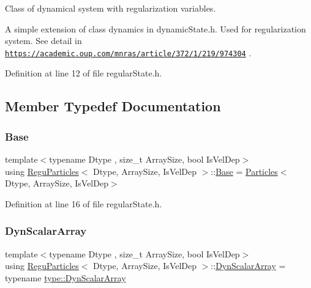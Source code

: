 Class of dynamical system with regularization variables. 

A simple extension of class dynamics in dynamic\+State.\+h. Used for regularization system. See detail in \href{https://academic.oup.com/mnras/article/372/1/219/974304}{\tt https\+://academic.\+oup.\+com/mnras/article/372/1/219/974304} . 

Definition at line 12 of file regular\+State.\+h.



\subsection{Member Typedef Documentation}
\mbox{\label{class_regu_particles_afcabde6e4f3c2648f37b23fee95758e0}} 
\subsubsection{\texorpdfstring{Base}{Base}}
{\footnotesize\ttfamily template$<$typename Dtype , size\+\_\+t Array\+Size, bool Is\+Vel\+Dep$>$ \\
using \mbox{\hyperlink{class_regu_particles}{Regu\+Particles}}$<$ Dtype, Array\+Size, Is\+Vel\+Dep $>$\+::\mbox{\hyperlink{class_regu_particles_afcabde6e4f3c2648f37b23fee95758e0}{Base}} =  \mbox{\hyperlink{struct_particles}{Particles}}$<$Dtype, Array\+Size, Is\+Vel\+Dep$>$}



Definition at line 16 of file regular\+State.\+h.

\mbox{\label{class_regu_particles_abaa96fd6cb4ad1fca4a6c726480a0681}} 
\subsubsection{\texorpdfstring{Dyn\+Scalar\+Array}{DynScalarArray}}
{\footnotesize\ttfamily template$<$typename Dtype , size\+\_\+t Array\+Size, bool Is\+Vel\+Dep$>$ \\
using \mbox{\hyperlink{class_regu_particles}{Regu\+Particles}}$<$ Dtype, Array\+Size, Is\+Vel\+Dep $>$\+::\mbox{\hyperlink{class_vel_indep_particles_a6bba8ac3f941a144214037a27ccaa119}{Dyn\+Scalar\+Array}} =  typename \mbox{\hyperlink{struct_space_h_1_1_proto_type_a8f3813f576517856e0ed74af9e5ffcb4}{type\+::\+Dyn\+Scalar\+Array}}}



